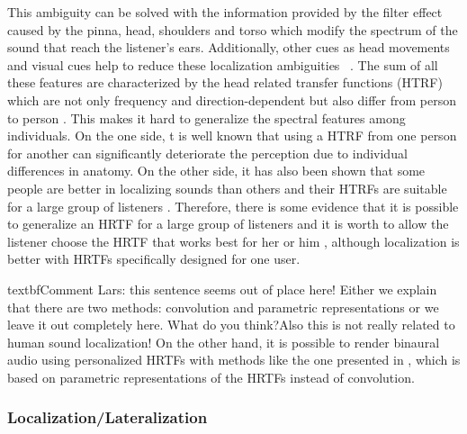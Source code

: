 \documentclass[journal]{IEEEtran}
\begin{document}
This ambiguity can be solved with the information provided by the filter effect caused by the pinna, head, shoulders and torso which modify the spectrum of the sound that reach the listener's ears. Additionally, other cues as head movements and visual cues help to reduce these localization ambiguities ~\cite{SpatialAudio2007}. The sum of all these features are characterized by the head related transfer functions (HTRF) which are not only frequency and direction-dependent but also differ from person to person \cite{Rumsey2001}. This makes it hard to generalize the spectral features among individuals. On the one side, t is well known that using a HTRF from one person for another can significantly deteriorate the perception due to individual differences in anatomy. On the other side, it has also been shown that some people are better in localizing sounds than others and their HTRFs are suitable for a large group of listeners \cite{SpatialAudio2007}. Therefore, there is some evidence that it is possible to generalize an HRTF for a large group of listeners and it is worth to allow the listener choose the HRTF that works best for her or him \cite{Tame2012}, although localization is better with HRTFs specifically designed for one user. 

textbf{Comment Lars: this sentence seems out of place here! Either we explain that there are two methods: convolution and parametric representations or we leave it out completely here. What do you think?Also this is not really related to human sound localization!}
On the other hand, it is possible to render binaural audio using personalized HRTFs with methods like the one presented in \cite{SpatialAudio2007}, which is based on parametric representations of the HRTFs instead of convolution.\\

 

\subsubsection*{Localization/Lateralization}~\\
\end{document}
